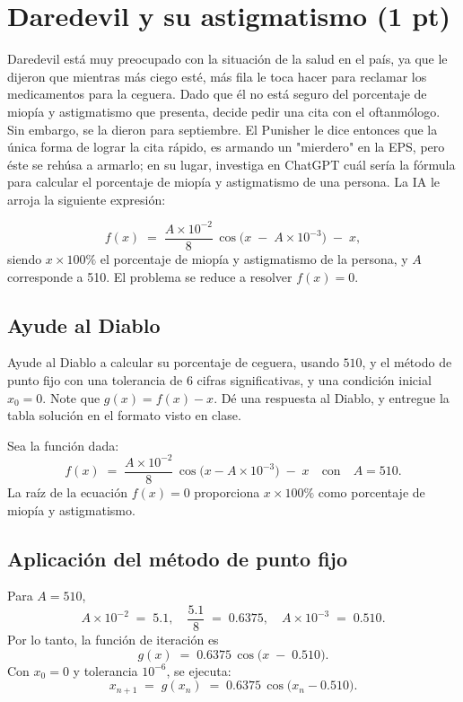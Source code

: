 \section{Daredevil y su astigmatismo (1 pt)}

Daredevil está muy preocupado con la situación de la salud en el país, ya que le dijeron que mientras más ciego esté,  más fila le toca hacer para reclamar los medicamentos para la ceguera. Dado que él no está seguro del porcentaje de miopía y astigmatismo que presenta, decide pedir una cita con el oftanmólogo. Sin embargo, se la dieron para septiembre. El Punisher le dice entonces que la única forma de lograr la cita rápido, es armando un "mierdero" en la EPS, pero éste se rehúsa a armarlo; en su lugar, investiga en ChatGPT cuál sería la fórmula para calcular el porcentaje de miopía y astigmatismo de una persona. La IA le arroja la siguiente expresión:

\[
f(x) \;=\; \frac{A\times 10^{-2}}{8} \,\cos\bigl(x \;-\; A\times 10^{-3}\bigr) \;-\; x,
\]
siendo \(x \times 100\%\) el porcentaje de miopía y astigmatismo de la persona, y \(A\) corresponde a 510. El problema se reduce a resolver \(f(x) = 0\).

\subsection{Ayude al Diablo}

Ayude  al Diablo a calcular su porcentaje de ceguera, usando $510$, y el
método de punto fijo con una tolerancia de 6 cifras significativas, y una
condición inicial $x_0 = 0$. Note que $g(x) = f(x) - x$.
Dé una respuesta al Diablo, y entregue la tabla solución en el formato visto en clase.

Sea la función dada:
\[
f(x) \;=\; \frac{A\times10^{-2}}{8}\,\cos\bigl(x - A\times10^{-3}\bigr)\;-\;x
\quad\text{con}\quad A=510.
\]
La raíz de la ecuación \(f(x)=0\) proporciona \(x \times 100\%\) como porcentaje de miopía y astigmatismo.

\subsection{Aplicación del método de punto fijo}

Para \(A = 510\),
\[
A\times 10^{-2} \;=\; 5.1,
\quad
\frac{5.1}{8} \;=\; 0.6375,
\quad
A\times 10^{-3} \;=\; 0.510.
\]
Por lo tanto, la función de iteración es
\[
g(x) \;=\; 0.6375 \,\cos\bigl(x \;-\; 0.510\bigr).
\]
Con \(x_0 = 0\) y tolerancia \(10^{-6}\), se ejecuta:
\[
x_{n+1} \;=\; g(x_n) \;=\; 0.6375 \,\cos\bigl(x_n - 0.510\bigr).
\]

